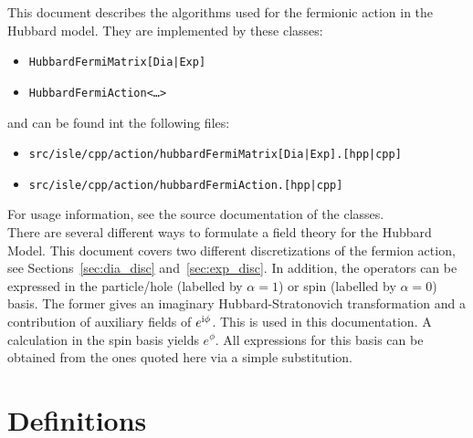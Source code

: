\documentclass[a4paper, fleqn, twoside, notitlepage]{scrartcl}
\begin{document}
\maketitle
\vspace{-3em}
\tableofcontents

\vfill
\vspace{1em}
\noindent
This document describes the algorithms used for the fermionic action in the Hubbard model.
They are implemented by these classes:
\begin{itemize}
\item \texttt{HubbardFermiMatrix[Dia|Exp]}
\item \texttt{HubbardFermiAction<\ldots>}
\end{itemize}
and can be found int the following files:
\begin{itemize}
\item \texttt{src/isle/cpp/action/hubbardFermiMatrix[Dia|Exp].[hpp|cpp]}
\item \texttt{src/isle/cpp/action/hubbardFermiAction.[hpp|cpp]}
\end{itemize}
For usage information, see the source documentation of the classes.\\

\noindent
There are several different ways to formulate a field theory for the Hubbard Model.
This document covers two different discretizations of the fermion action, see Sections~\ref{sec:dia_disc} and~\ref{sec:exp_disc}.
In addition, the operators can be expressed in the particle/hole (labelled by $\alpha=1$) or spin (labelled by $\alpha=0$) basis.
The former gives an imaginary Hubbard-Stratonovich transformation and a contribution of auxiliary fields of $e^{\mathrm{i}\phi}$.
This is used in this documentation.
A calculation in the spin basis yields $e^\phi$.
All expressions for this basis can be obtained from the ones quoted here via a simple substitution.

\clearpage
\section{Definitions}
\end{document}
